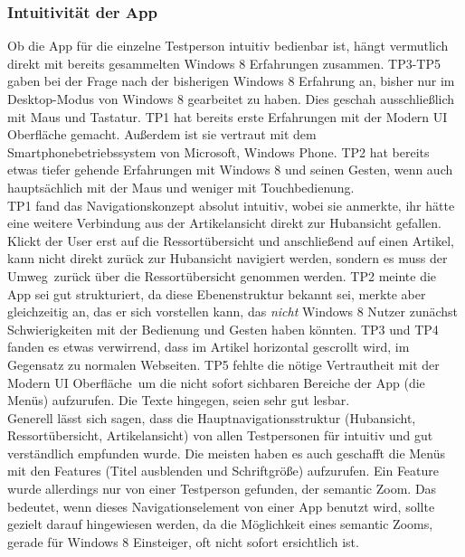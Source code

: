 \documentclass[12pt,a4paper,bibtotoc,abstracton]{scrartcl}
\begin{document}
\subsubsection{Intuitivität der App} 
\label{subsubsec:intuitivitätderapp}
Ob die App für die einzelne Testperson intuitiv bedienbar ist, hängt vermutlich direkt mit bereits gesammelten Windows 8 Erfahrungen zusammen. TP3-TP5 gaben bei der Frage nach der bisherigen Windows 8 Erfahrung an, bisher nur im Desktop-Modus von Windows 8 gearbeitet zu haben. Dies geschah ausschließlich mit Maus und Tastatur. TP1 hat bereits erste Erfahrungen mit der Modern UI Oberfläche gemacht. Außerdem ist sie vertraut mit dem Smartphonebetriebssystem von Microsoft, Windows Phone. TP2 hat bereits etwas tiefer gehende Erfahrungen mit Windows 8 und seinen Gesten, wenn auch hauptsächlich mit der Maus und weniger mit Touchbedienung.\\

TP1 fand das Navigationskonzept \glqq absolut intuitiv\grqq, wobei sie anmerkte, ihr hätte eine weitere Verbindung aus der Artikelansicht direkt zur Hubansicht gefallen. Klickt der User erst auf die Ressortübersicht und anschließend auf einen Artikel, kann nicht direkt zurück zur Hubansicht navigiert werden, sondern es muss der \glqq Umweg\grqq\ zurück über die Ressortübersicht genommen werden. TP2 meinte die App sei gut strukturiert, da diese Ebenenstruktur bekannt sei, merkte aber gleichzeitig an, das er sich vorstellen kann, das \textit{nicht} Windows 8 Nutzer zunächst Schwierigkeiten mit der Bedienung und Gesten haben könnten. TP3 und TP4 fanden es etwas verwirrend, dass im Artikel horizontal gescrollt wird, im Gegensatz zu normalen Webseiten. TP5 \glqq fehlte die nötige Vertrautheit mit der Modern UI Oberfläche\grqq\ um die nicht sofort sichbaren Bereiche der App (die Menüs) aufzurufen. Die Texte hingegen, seien sehr gut lesbar.\\

Generell lässt sich sagen, dass die Hauptnavigationsstruktur (Hubansicht, Ressortübersicht, Artikelansicht) von allen Testpersonen für intuitiv und gut verständlich empfunden wurde. Die meisten haben es auch geschafft die Menüs mit den Features (Titel ausblenden und Schriftgröße) aufzurufen. Ein Feature wurde allerdings nur von einer Testperson gefunden, der semantic Zoom. Das bedeutet, wenn dieses Navigationselement von einer App benutzt wird, sollte gezielt darauf hingewiesen werden, da die Möglichkeit eines semantic Zooms, gerade für Windows 8 Einsteiger, oft nicht sofort ersichtlich ist.
\end{document}
